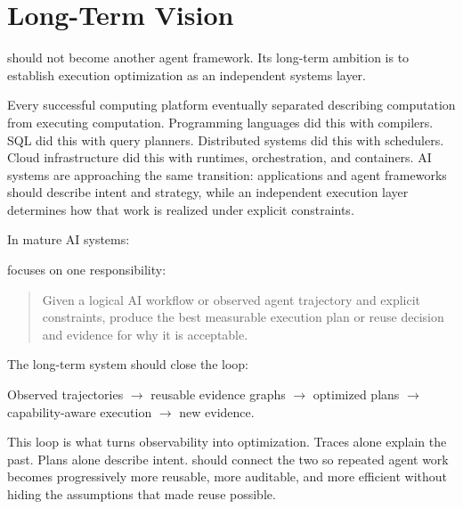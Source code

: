 \section{Long-Term Vision}

\migaki{} should not become another agent framework. Its long-term ambition is to establish execution optimization as an independent systems layer.

Every successful computing platform eventually separated describing computation from executing computation. Programming languages did this with compilers. SQL did this with query planners. Distributed systems did this with schedulers. Cloud infrastructure did this with runtimes, orchestration, and containers. AI systems are approaching the same transition: applications and agent frameworks should describe intent and strategy, while an independent execution layer determines how that work is realized under explicit constraints.

In mature AI systems:

\begin{center}
\end{center}

\migaki{} focuses on one responsibility:

\begin{quote}
Given a logical AI workflow or observed agent trajectory and explicit constraints, produce the best measurable execution plan or reuse decision and evidence for why it is acceptable.
\end{quote}

The long-term system should close the loop:

\begin{center}
Observed trajectories $\rightarrow$ reusable evidence graphs $\rightarrow$ optimized \mir{} plans $\rightarrow$ capability-aware execution $\rightarrow$ new evidence.
\end{center}

This loop is what turns observability into optimization. Traces alone explain the past. Plans alone describe intent. \migaki{} should connect the two so repeated agent work becomes progressively more reusable, more auditable, and more efficient without hiding the assumptions that made reuse possible.
